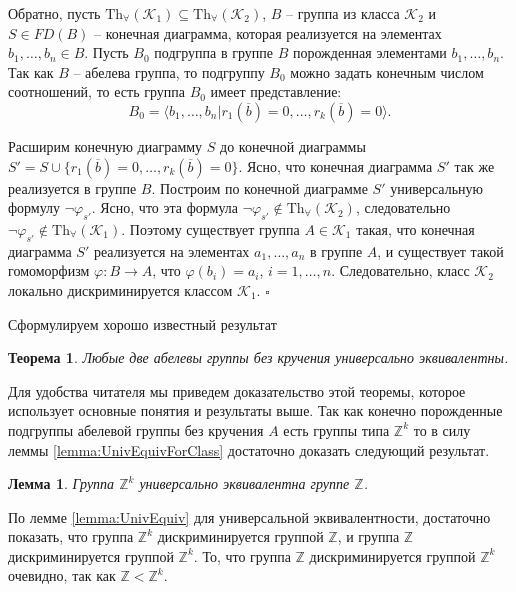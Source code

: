 \documentclass[a4paper,11pt,twoside]{article}
\newtheorem{theorem}{Теорема}[section]
\newtheorem{lemma}{Лемма}[section]
\def\proof{{\noindent{\bf Доказательство.}} }
\def\K{{\mathcal{K}}}
\def\Z{{\mathbb{Z}}}
\def\Tha{{\mathrm{Th}_\forall}}
\begin{document}
Обратно, пусть $\Tha(\K_1) \subseteq \Tha(\K_2)$, $B$ -- группа из класса $\K_2$ и $S \in FD(B)$ -- конечная диаграмма, которая реализуется на элементах $b_1, \ldots, b_n \in B$. Пусть $B_0$ подгруппа в группе $B$ порожденная элементами $b_1, \ldots, b_n$. Так как $B$ -- абелева группа, то подгруппу $B_0$ можно задать конечным числом соотношений, то есть группа $B_0$ имеет представление:
 $$B_0 = \langle b_1, \ldots, b_n | r_1(\overline{b}) = 0, \ldots, r_k(\overline{b}) = 0 \rangle.$$

Расширим конечную диаграмму $S$ до конечной диаграммы $S' = S \cup \{r_1(\overline{b}) = 0, \ldots, r_k(\overline{b}) = 0\}$. Ясно, что конечная диаграмма $S'$ так же реализуется в группе $B$. Построим по конечной диаграмме $S'$ универсальную формулу $\neg\varphi_{s'}$. Ясно, что эта формула $\neg\varphi_{s'} \notin \Tha(\K_2)$, следовательно $\neg\varphi_{s'} \notin \Tha(\K_1)$. Поэтому существует группа $A \in \K_1$ такая, что конечная диаграмма $S'$ реализуется на элементах $a_1, \ldots, a_n$ в группе $A$, и существует такой гомоморфизм $\varphi: B \rightarrow A$, что $\varphi(b_i) = a_i$, $i = 1, \ldots, n$. Следовательно, класс $\K_2$ локально дискриминируется классом $\K_1$. $\square$

Сформулируем хорошо известный результат

\begin{theorem}\label{th:AbelUnivEquiv}
Любые две абелевы группы без кручения универсально эквивалентны.
\end{theorem}

Для удобства читателя мы приведем доказательство этой теоремы, которое использует основные понятия и результаты выше. Так как конечно порожденные подгруппы абелевой группы без кручения $A$ есть группы типа $\Z^k$ то в силу леммы \ref{lemma:UnivEquivForClass} достаточно доказать следующий результат.

\begin{lemma}\label{lemma:UnivEquivZk}
Группа $\Z^k$ универсально эквивалентна группе $\Z$.
\end{lemma}

\proof По лемме \ref{lemma:UnivEquiv} для универсальной эквивалентности, достаточно показать, что группа $\Z^k$ дискриминируется группой $\Z$, и группа $\Z$ дискриминируется группой $\Z^k$. То, что группа $\Z$ дискриминируется группой $\Z^k$ очевидно, так как $\Z < \Z^k$. 
\end{document}
